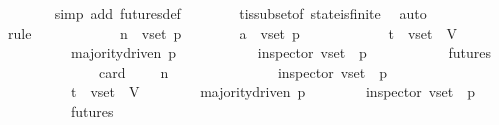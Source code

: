\begin{isabellebody}
\ \ \ \ \ \ \isamarkupfalse%
\ {\isacharparenleft}simp\ add{\isacharcolon}\ futures{\isacharunderscore}def{\isacharparenright}\isanewline
\ \ \ \ \ \ \isamarkupfalse%
\ {\isasymSigma}t{\isacharunderscore}is{\isacharunderscore}subset{\isacharunderscore}of{\isacharunderscore}{\isasymSigma}\ state{\isacharunderscore}is{\isacharunderscore}finite\ \isamarkupfalse%
\ auto{\isacharbrackleft}{}{\isacharbrackright}\ \isanewline
\ \ \ \ \ \ \isamarkupfalse%
\ {\isacharparenleft}rule{\isacharplus}{\isacharparenright}\isanewline
\ \ \ \isamarkupfalse%
\ {\isacharminus}\isanewline
\ \ \ \ \ \isamarkupfalse%
\ n\ {\isasymsigma}\ v{\isacharunderscore}set\ p\ {\isasymsigma}{\isacharprime}\isanewline
\ \ \ \ \ \isamarkupfalse%
\ a{}{\isacharcolon}\ {\isachardoublequoteopen}{\isasymforall}{\isasymsigma}\ v{\isacharunderscore}set\ p{\isachardot}\isanewline
\ \ \ \ \ \ \ \ \ \ {\isasymsigma}\ {\isasymin}\ {\isasymSigma}t\ {\isasymand}\ v{\isacharunderscore}set\ {\isasymsubseteq}\ V\ {\isasymlongrightarrow}\isanewline
\ \ \ \ \ \ \ \ \ \ majority{\isacharunderscore}driven\ p\ {\isasymlongrightarrow}\isanewline
\ \ \ \ \ \ \ \ \ \ inspector\ {\isacharparenleft}v{\isacharunderscore}set{\isacharcomma}\ {\isasymsigma}{\isacharcomma}\ p{\isacharparenright}\ {\isasymlongrightarrow}\isanewline
\ \ \ \ \ \ \ \ \ \ {\isacharparenleft}{\isasymforall}{\isasymsigma}{\isacharprime}{\isasymin}futures\ {\isasymsigma}{\isachardot}\isanewline
\ \ \ \ \ \ \ \ \ \ \ \ \ \ card\ {\isacharparenleft}{\isasymsigma}{\isacharprime}\ {\isacharminus}\ {\isasymsigma}{\isacharparenright}\ {\isacharequal}\ n\ {\isasymlongrightarrow}\isanewline
\ \ \ \ \ \ \ \ \ \ \ \ \ \ inspector\ {\isacharparenleft}v{\isacharunderscore}set{\isacharcomma}\ {\isasymsigma}{\isacharprime}{\isacharcomma}\ p{\isacharparenright}{\isacharparenright}{\isachardoublequoteclose}\isanewline
\ \ \ \ \ \ \ \ {\isachardoublequoteopen}{\isasymsigma}\ {\isasymin}\ {\isasymSigma}t\ {\isasymand}\ v{\isacharunderscore}set\ {\isasymsubseteq}\ V{\isachardoublequoteclose}\isanewline
\ \ \ \ \ \ \ \ {\isachardoublequoteopen}majority{\isacharunderscore}driven\ p{\isachardoublequoteclose}\isanewline
\ \ \ \ \ \ \ \ {\isachardoublequoteopen}inspector\ {\isacharparenleft}v{\isacharunderscore}set{\isacharcomma}\ {\isasymsigma}{\isacharcomma}\ p{\isacharparenright}{\isachardoublequoteclose}\isanewline
\ \ \ \ \ \ \ \ {\isachardoublequoteopen}{\isasymsigma}{\isacharprime}\ {\isasymin}\ futures\ {\isasymsigma}{\isachardoublequoteclose}\isanewline

\end{isabellebody}
